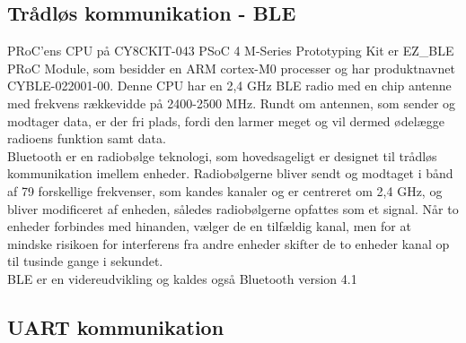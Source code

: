 \subsection{Trådløs kommunikation - BLE} 
PRoC'ens CPU på CY8CKIT-043 PSoC 4 M-Series Prototyping Kit er EZ_BLE PRoC Module, som besidder en ARM cortex-M0 processer og har produktnavnet CYBLE-022001-00. Denne CPU har en 2,4 GHz BLE radio med en chip antenne med frekvens rækkevidde på 2400-2500 MHz. Rundt om antennen, som sender og modtager data, er der fri plads, fordi den larmer meget og vil dermed ødelægge radioens funktion samt data. \citep{Semiconductor2016PRoC,Semiconductor2016BLEdyb}\\
Bluetooth er en radiobølge teknologi, som hovedsageligt er designet til trådløs kommunikation imellem enheder. Radiobølgerne bliver sendt og modtaget i bånd af 79 forskellige frekvenser, som kandes kanaler og er centreret om 2,4 GHz, og bliver modificeret af enheden, således radiobølgerne opfattes som et signal. Når to enheder forbindes med hinanden, vælger de en tilfældig kanal, men for at mindske risikoen for interferens fra andre enheder skifter de to enheder kanal op til tusinde gange i sekundet. \citep{Sauter2011} \\
BLE er en videreudvikling og kaldes også Bluetooth version 4.1

\citep{Cho2015,Semiconductor2016PRoC,Semiconductor2016BLEdyb}

\subsection{UART kommunikation} %

%
%
%
